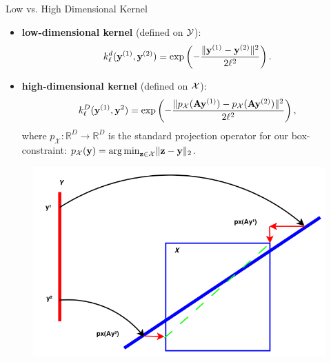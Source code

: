 \documentclass[final]{beamer}
\begin{document}
\begin{frame}[t]
\begin{columns}[T]
\begin{column}{.48\textwidth}
\begin{block}{Low vs. High Dimensional Kernel}
 \begin{minipage}[l]{0.57\columnwidth}
    \begin{itemize}
    \small
   \item {\bf \textcolor{myColor}{low-dimensional kernel}} (defined on 
   {\bf \textcolor{myColor}{$\cal Y$}}):\\
   $$k_{\ell}^d(\mathbf{y}^{(1)},\mathbf{y}^{(2)}) = \exp\left({-\frac{\|\mathbf{y}^{(1)}-\mathbf{y}^{(2)}\|^2}{2\ell^2}}\right). $$
  \end{itemize}
  \begin{itemize}
 \small
  \item {\bf \textcolor{myColor}{high-dimensional kernel}} (defined on 
   {\bf \textcolor{myColor}{$\cal X$}}):  
  $$k_{\ell}^D(\mathbf{y}^{(1)}, \mathbf{y}^2) = \exp\left( -\frac{\| p_{\mathcal{X}}(\mathbf{A}\mathbf{y}^{(1)}) - p_{\mathcal{X}}(\mathbf{A}\mathbf{y}^{(2)}) \|^2}{2\ell^2} \right),$$
  where $p_{\mathcal{X}}:\mathbb{R}^D \rightarrow \mathbb{R}^D$ is the standard projection operator for our box-constraint: $p_{\mathcal{X}}(\mathbf{y}) = {\arg \min}_{\mathbf{z}\in \mathcal{X}} \|\mathbf{z}-\mathbf{y}\|_2$. 
  \end{itemize}
  \end{minipage}
 \begin{minipage}[r]{0.42\columnwidth}
  \begin{figure}
  \begin{flushright}
   \includegraphics[width=1\columnwidth]{../Presentation/figs/low_high_dim.png}
   \end{flushright}
  \end{figure}
 \end{minipage}
 
\end{block}


\end{column}
\end{columns}
\end{frame}
\end{document}
